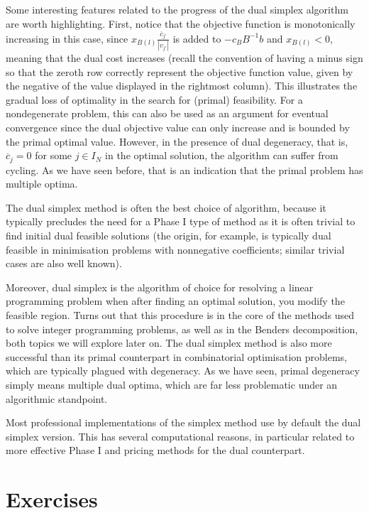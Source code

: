 Some interesting features related to the progress of the dual simplex algorithm are worth highlighting. First, notice that the objective function is monotonically increasing in this case, since $x_{B(l)}\frac{\overline{c}_{j'}}{|v_{j'}|}$ is added to $-c_BB^{-1}b$ and $x_{B(l)} < 0$, meaning that the dual cost increases (recall the convention of having a minus sign so that the zeroth row correctly represent the objective function value, given by the negative of the value displayed in the rightmost column). This illustrates the gradual loss of optimality in the search for (primal) feasibility. For a nondegenerate problem, this can also be used as an argument for eventual convergence since the dual objective value can only increase and is bounded by the primal optimal value. However, in the presence of dual degeneracy, that is, $\overline{c}_{j} = 0$ for some $j \in I_N$ in the optimal solution, the algorithm can suffer from cycling. As we have seen before, that is an indication that the primal problem has multiple optima. 

The dual simplex method is often the best choice of algorithm, because it typically precludes the need for a Phase I type of method as it is often trivial to find initial dual feasible solutions (the origin, for example, is typically dual feasible in minimisation problems with nonnegative coefficients; similar trivial cases are also well known).

Moreover, dual simplex is the algorithm of choice for resolving a linear programming problem when after finding an optimal solution, you modify the feasible region. Turns out that this procedure is in the core of the methods used to solve integer programming problems, as well as in the Benders decomposition, both topics we will explore later on. The dual simplex method is also more successful than its primal counterpart in combinatorial optimisation problems, which are typically plagued with degeneracy. As we have seen, primal degeneracy simply means multiple dual optima, which are far less problematic under an algorithmic standpoint.

Most professional implementations of the simplex method use by default the dual simplex version. This has several computational reasons, in particular related to more effective Phase I and pricing methods for the dual counterpart.

\vfill
\pagebreak
 
\section{Exercises}


